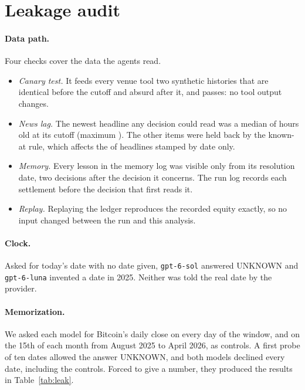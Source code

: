 \section{Leakage audit}\label{sec:leakage}

\paragraph{Data path.} Four checks cover the data the agents read.
\begin{itemize}
\item \emph{Canary test.} It feeds every venue tool two synthetic histories that are identical before the cutoff and absurd after it, and passes: no tool output changes.
\item \emph{News lag.} The newest headline any decision could read was a median of \NewsAgeMed{} hours old at its cutoff (maximum \NewsAgeMax{}). The other items were held back by the known-at rule, which affects the \NewsDateOnly{} of headlines stamped by date only.
\item \emph{Memory.} Every lesson in the memory log was visible only from its resolution date, two decisions after the decision it concerns. The run log records each settlement before the decision that first reads it.
\item \emph{Replay.} Replaying the ledger reproduces the recorded equity exactly, so no input changed between the run and this analysis.
\end{itemize}

\paragraph{Clock.} Asked for today's date with no date given, \texttt{gpt-6-sol} answered UNKNOWN and \texttt{gpt-6-luna} invented a date in 2025. Neither was told the real date by the provider.

\paragraph{Memorization.} We asked each model for Bitcoin's daily close on every day of the window, and on the 15th of each month from August 2025 to April 2026, as controls. A first probe of ten dates allowed the answer UNKNOWN, and both models declined every date, including the controls. Forced to give a number, they produced the results in Table~\ref{tab:leak}.

\begin{table}[h]\centering\small
\caption{Forced price estimates. Errors are medians of $|\hat P/P-1|$ over 9 controls and 30 window days. ``Guessed'' and ``realized'' changes run from 1 to 30 October. ``Corr.'' is the correlation between guessed and realized closes over the window, with a Fisher-$z$ $p$-value.}\label{tab:leak}

\end{table}

